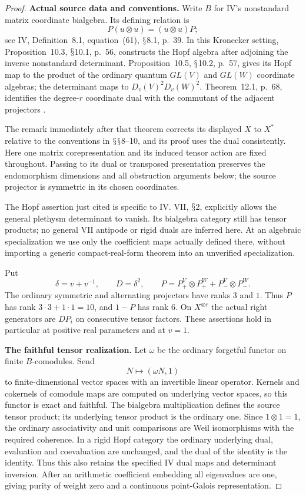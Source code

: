 \documentclass[11pt,a4paper]{article}
\renewcommand{\S}{\ensuremath{\mathsection}}
\theoremstyle{named}\newtheorem{finding}{Finding}[section]
\theoremstyle{definition}\newtheorem{definition}[finding]{Definition}
\theoremstyle{remark}\newtheorem{remark}[finding]{Remark}
\begin{document}
\begin{proof}
\par\smallskip\noindent\textbf{Actual source data and conventions.}\quad
Write $B$ for IV's nonstandard matrix coordinate bialgebra.
Its defining relation is
\[
 P(u\otimes u)=(u\otimes u)P;
\]
see IV, Definition~8.1, equation~(61), \S8.1, p.~39.
In this Kronecker setting, Proposition~10.3, \S10.1, p.~56,
constructs the Hopf algebra after adjoining the inverse
nonstandard determinant. Proposition~10.5, \S10.2, p.~57,
gives its Hopf map to the product of the ordinary quantum
$GL(V)$ and $GL(W)$ coordinate algebras; the determinant
maps to $D_v(V)^2D_v(W)^2$.
Theorem~12.1, p.~68, identifies the degree-$r$ coordinate
dual with the commutant of the adjacent projectors
\cite{IV}.

The remark immediately after that theorem corrects its
displayed $X$ to $X^*$ relative to the conventions in
\S\S8--10, and its proof uses the dual consistently.
Here one matrix corepresentation and its induced tensor
action are fixed throughout. Passing to its dual or
transposed presentation preserves the endomorphism
dimensions and all obstruction arguments below; the
source projector is symmetric in its chosen coordinates.

The Hopf assertion just cited is specific to IV.
VII, \S2, explicitly allows the general plethysm determinant
to vanish. Its bialgebra category still has tensor products;
no general VII antipode or rigid duals are inferred here.
At an algebraic specialization we use only the coefficient
maps actually defined there, without importing a generic
compact-real-form theorem into an unverified specialization.

Put
\[
 \delta=v+v^{-1},\qquad D=\delta^2,\qquad
 P=P_+^V\otimes P_+^W+P_-^V\otimes P_-^W.
\]
The ordinary symmetric and alternating projectors have ranks
$3$ and $1$. Thus $P$ has rank $3\cdot3+1\cdot1=10$,
and $1-P$ has rank $6$. On $X^{\otimes r}$ the actual
right generators are $DP_i$ on consecutive tensor factors.
These assertions hold in particular at positive real
parameters and at $v=1$.

\par\smallskip\noindent\textbf{The faithful tensor realization.}\quad
Let $\omega$ be the ordinary forgetful functor on finite
$B$-comodules. Send
\[
 N\longmapsto(\omega N,1)
\]
to finite-dimensional vector spaces with an invertible
linear operator. Kernels and cokernels of comodule maps
are computed on underlying vector spaces, so this functor
is exact and faithful. The bialgebra multiplication defines
the source tensor product; its underlying tensor product
is the ordinary one. Since $1\otimes1=1$, the ordinary
associativity and unit comparisons are Weil isomorphisms
with the required coherence.
In a rigid Hopf category the ordinary underlying dual,
evaluation and coevaluation are unchanged, and the dual
of the identity is the identity. Thus this also retains
the specified IV dual maps and determinant inversion.
After an arithmetic coefficient embedding all eigenvalues
are one, giving purity of weight zero and a continuous
point-Galois representation.


\end{proof}
\end{document}
